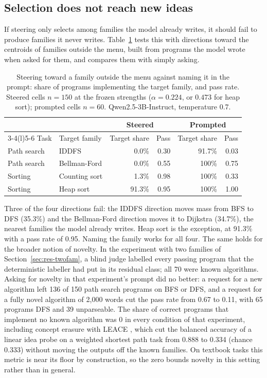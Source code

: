 \documentclass[11pt,letterpaper]{article}
\begin{document}
\subsection{Selection does not reach new ideas}
\label{sec:res-offmenu}

If steering only selects among families the model already writes, it should fail to produce families it never writes. Table~\ref{tab:offmenu} tests this with directions toward the centroids of families outside the menu, built from programs the model wrote when asked for them, and compares them with simply asking.

\begin{table}[!htbp]
\centering
\caption{Steering toward a family outside the menu against naming it in the prompt: share of programs implementing the target family, and pass rate. Steered cells $n = 150$ at the frozen strengths ($\alpha = 0.224$, or $0.473$ for heap sort); prompted cells $n = 60$. Qwen2.5-3B-Instruct, temperature 0.7.}
\label{tab:offmenu}
\small
\begin{tabular}{@{}llrrrr@{}}
\toprule
 & & \multicolumn{2}{c}{Steered} & \multicolumn{2}{c}{Prompted} \\
\cmidrule(lr){3-4}\cmidrule(l){5-6}
Task & Target family & Target share & Pass & Target share & Pass \\
\midrule
Path search & IDDFS & 0.0\% & 0.30 & 91.7\% & 0.03 \\
Path search & Bellman-Ford & 0.0\% & 0.55 & 100\% & 0.75 \\
Sorting & Counting sort & 1.3\% & 0.98 & 100\% & 0.33 \\
Sorting & Heap sort & 91.3\% & 0.95 & 100\% & 1.00 \\
\bottomrule
\end{tabular}
\end{table}

Three of the four directions fail: the IDDFS direction moves mass from BFS to DFS (35.3\%) and the Bellman-Ford direction moves it to Dijkstra (34.7\%), the nearest families the model already writes. Heap sort is the exception, at 91.3\% with a pass rate of 0.95. Naming the family works for all four. The same holds for the broader notion of novelty. In the experiment with two families of Section~\ref{sec:res-twofam}, a blind judge labelled every passing program that the deterministic labeller had put in its residual class; all 70 were known algorithms. Asking for novelty in that experiment's prompt did no better: a request for a new algorithm left 136 of 150 path search programs on BFS or DFS, and a request for a fully novel algorithm of 2{,}000 words cut the pass rate from 0.67 to 0.11, with 65 programs DFS and 39 unparseable. The share of correct programs that implement no known algorithm was 0 in every condition of that experiment, including concept erasure with LEACE \citep{Belrose2023}, which cut the balanced accuracy of a linear idea probe on a weighted shortest path task from 0.888 to 0.334 (chance 0.333) without moving the outputs off the known families. On textbook tasks this metric is near its floor by construction, so the zero bounds novelty in this setting rather than in general.
\end{document}
